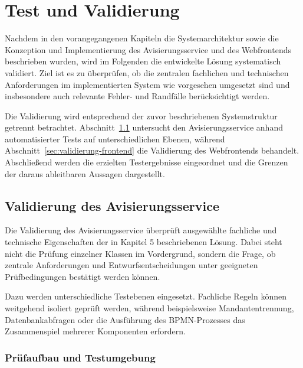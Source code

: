 \documentclass[
  12pt,
  a4paper,
  oneside
]{article}
\begin{document}
\tableofcontents
\clearpage

\setcounter{section}{6}

\section{Test und Validierung}
\label{sec:test-validierung}

Nachdem in den vorangegangenen Kapiteln die Systemarchitektur sowie die
Konzeption und Implementierung des Avisierungsservice und des Webfrontends
beschrieben wurden, wird im Folgenden die entwickelte Lösung systematisch
validiert. Ziel ist es zu überprüfen, ob die zentralen fachlichen und
technischen Anforderungen im implementierten System wie vorgesehen umgesetzt
sind und insbesondere auch relevante Fehler- und Randfälle berücksichtigt
werden.

Die Validierung wird entsprechend der zuvor beschriebenen Systemstruktur
getrennt betrachtet. Abschnitt~\ref{sec:validierung-avisierungsservice-backend}
untersucht den Avisierungsservice anhand automatisierter Tests auf
unterschiedlichen Ebenen, während
Abschnitt~\ref{sec:validierung-frontend} die Validierung des Webfrontends
behandelt. Abschließend werden die erzielten Testergebnisse eingeordnet und die
Grenzen der daraus ableitbaren Aussagen dargestellt.

\subsection{Validierung des Avisierungsservice}
\label{sec:validierung-avisierungsservice-backend}

Die Validierung des Avisierungsservice überprüft ausgewählte fachliche und
technische Eigenschaften der in Kapitel 5 beschriebenen Lösung. Dabei steht
nicht die Prüfung einzelner Klassen im Vordergrund, sondern die Frage, ob
zentrale Anforderungen und Entwurfsentscheidungen unter geeigneten
Prüfbedingungen bestätigt werden können.

Dazu werden unterschiedliche Testebenen eingesetzt. Fachliche Regeln können
weitgehend isoliert geprüft werden, während beispielsweise Mandantentrennung,
Datenbankabfragen oder die Ausführung des BPMN-Prozesses das Zusammenspiel
mehrerer Komponenten erfordern.

\subsubsection{Prüfaufbau und Testumgebung}
\label{sec:teststrategie-anforderungsbezug-testumgebung}
\end{document}
